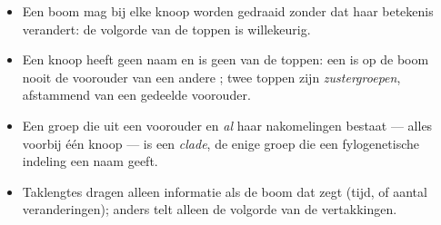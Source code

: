 \begin{proposition}\label{prop:g12:phylogenetic-trees:rules}
\begin{itemize}
  \item Een boom mag bij elke knoop worden gedraaid zonder dat haar
        betekenis verandert: de volgorde van de toppen is willekeurig.
  \item Een knoop heeft geen naam en is geen van de toppen: een  is
        op de boom nooit de voorouder van een andere ; twee toppen
        zijn \emph{zustergroepen}, afstammend van een gedeelde voorouder.
  \item Een groep die uit een voorouder en \emph{al} haar nakomelingen
        bestaat --- alles voorbij één knoop --- is een
        \emph{clade}, de enige  groep die een
        fylogenetische indeling een naam geeft.
  \item Taklengtes dragen alleen informatie als de boom dat zegt (tijd,
        of aantal veranderingen); anders telt alleen de volgorde van de
        vertakkingen.
\end{itemize}
\end{proposition}
\admitted

